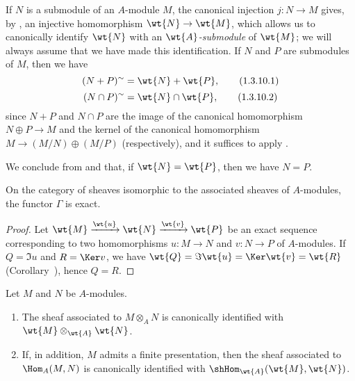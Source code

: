 \begin{env}[1.3.10]
\label{1.1.3.10}
If $N$ is a submodule of an $A$-module $M$, the canonical injection $j:N\to M$ gives, by , an injective homomorphism $\wt{N}\to\wt{M}$, which allows us to canonically identify $\wt{N}$ with an \emph{$\wt{A}$-submodule} of $\wt{M}$;
we will always assume that we have made this identification.
If $N$ and $P$ are submodules of $M$, then we have
\begin{equation*}
  \label{1.1.3.10.1}
  (N+P)^\sim=\wt{N}+\wt{P},
  \tag{1.3.10.1}
\end{equation*}
\begin{equation*}
  \label{1.1.3.10.2}
  (N\cap P)^\sim=\wt{N}\cap\wt{P},
  \tag{1.3.10.2}
\end{equation*}
since $N+P$ and $N\cap P$ are the image of the canonical homomorphism
$N\oplus P\to M$ and the kernel of the canonical homomorphism $M\to(M/N)\oplus(M/P)$ (respectively), and it suffices to apply .

We conclude from  and  that, if $\wt{N}=\wt{P}$, then we have $N=P$.
\end{env}

\begin{cor}[1.3.11]
\label{1.1.3.11}
On the category of sheaves isomorphic to the associated sheaves of $A$-modules, the functor $\Gamma$ is exact.
\end{cor}

\begin{proof}
\label{proof-1.1.3.11}
Let $\wt{M}\xrightarrow{\wt{u}}\wt{N}\xrightarrow{\wt{v}}\wt{P}$ be an exact sequence corresponding to two homomorphisms $u:M\to N$ and $v:N\to P$ of $A$-modules.
If $Q=\Im u$ and $R=\Ker v$, we have $\wt{Q}=\Im\wt{u}=\Ker\wt{v}=\wt{R}$ (Corollary~), hence $Q=R$.
\end{proof}

\begin{cor}[1.3.12]
\label{1.1.3.12}
Let $M$ and $N$ be $A$-modules.
\begin{enumerate}[label=\emph{(\roman*)}]
  \item The sheaf associated to $M\otimes_A N$ is canonically identified with $\wt{M}\otimes_\wt{A}\wt{N}$.
  \item If, in addition, $M$ admits a finite presentation, then the sheaf associated to $\Hom_A(M,N)$ is canonically identified with $\shHom_\wt{A}(\wt{M},\wt{N})$.
\end{enumerate}
\end{cor}

